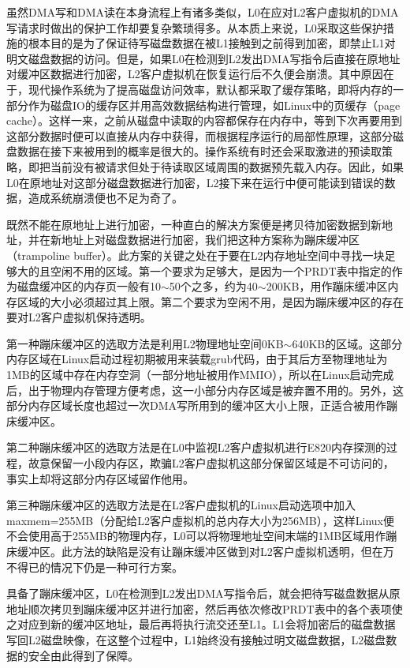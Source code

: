 虽然DMA写和DMA读在本身流程上有诸多类似，L0在应对L2客户虚拟机的DMA写请求时做出的保护工作却要复杂繁琐得多。从本质上来说，L0采取这些保护措施的根本目的是为了保证待写磁盘数据在被L1接触到之前得到加密，即禁止L1对明文磁盘数据的访问。但是，如果L0在检测到L2发出DMA写指令后直接在原地址对缓冲区数据进行加密，L2客户虚拟机在恢复运行后不久便会崩溃。其中原因在于，现代操作系统为了提高磁盘访问效率，默认都采取了缓存策略，即将内存的一部分作为磁盘IO的缓存区并用高效数据结构进行管理，如Linux中的页缓存（page cache）。这样一来，之前从磁盘中读取的内容都保存在内存中，等到下次再要用到这部分数据时便可以直接从内存中获得，而根据程序运行的局部性原理，这部分磁盘数据在接下来被用到的概率是很大的。操作系统有时还会采取激进的预读取策略，即把当前没有被请求但处于待读取区域周围的数据预先载入内存。因此，如果L0在原地址对这部分磁盘数据进行加密，L2接下来在运行中便可能读到错误的数据，造成系统崩溃便也不足为奇了。

既然不能在原地址上进行加密，一种直白的解决方案便是拷贝待加密数据到新地址，并在新地址上对磁盘数据进行加密，我们把这种方案称为蹦床缓冲区（trampoline buffer）。此方案的关键之处在于要在L2内存地址空间中寻找一块足够大的且空闲不用的区域。第一个要求为足够大，是因为一个PRDT表中指定的作为磁盘缓冲区的内存页一般有10$\sim$50个之多，约为40$\sim$200KB，用作蹦床缓冲区内存区域的大小必须超过其上限。第二个要求为空闲不用，是因为蹦床缓冲区的存在要对L2客户虚拟机保持透明。

第一种蹦床缓冲区的选取方法是利用L2物理地址空间0KB$\sim$640KB的区域。这部分内存区域在Linux启动过程初期被用来装载grub代码，由于其后方至物理地址为1MB的区域中存在内存空洞（一部分地址被用作MMIO），所以在Linux启动完成后，出于物理内存管理方便考虑，这一小部分内存区域是被弃置不用的。另外，这部分内存区域长度也超过一次DMA写所用到的缓冲区大小上限，正适合被用作蹦床缓冲区。

第二种蹦床缓冲区的选取方法是在L0中监视L2客户虚拟机进行E820内存探测的过程，故意保留一小段内存区，欺骗L2客户虚拟机这部分保留区域是不可访问的，事实上却将这部分内存区域留作他用。

第三种蹦床缓冲区的选取方法是在L2客户虚拟机的Linux启动选项中加入maxmem=255MB（分配给L2客户虚拟机的总内存大小为256MB），这样Linux便不会使用高于255MB的物理内存，L0可以将物理地址空间末端的1MB区域用作蹦床缓冲区。此方法的缺陷是没有让蹦床缓冲区做到对L2客户虚拟机透明，但在万不得已的情况下仍是一种可行方案。

具备了蹦床缓冲区，L0在检测到L2发出DMA写指令后，就会把待写磁盘数据从原地址顺次拷贝到蹦床缓冲区并进行加密，然后再依次修改PRDT表中的各个表项使之对应到新的缓冲区地址，最后再将执行流交还至L1。L1会将加密后的磁盘数据写回L2磁盘映像，在这整个过程中，L1始终没有接触过明文磁盘数据，L2磁盘数据的安全由此得到了保障。

